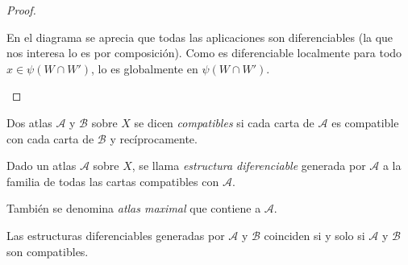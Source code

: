 \documentclass[../VD.tex]{subfiles}
\begin{document}
\begin{proof}
\begin{subproof}
    \begin{figure}[h]
      \centering
    \end{figure}

    En el diagrama se aprecia que todas las aplicaciones son diferenciables (la
    que nos interesa lo es por composición). Como es diferenciable localmente
    para todo \(x \in \psi(W \cap W')\), lo es globalmente en \(\psi(W \cap W')\).
  \end{subproof}
\end{proof}

\begin{definition}
  \label{def:atlas-compat}
  Dos atlas \(\mathcal{A}\) y \(\mathcal{B}\) sobre \(X\) se dicen
  \emph{compatibles} si cada carta de \(\mathcal{A}\) es compatible con cada
  carta de \(\mathcal{B}\) y recíprocamente.
\end{definition}

\begin{definition}
  \label{def:estructura-dif}
  Dado un atlas \(\mathcal{A}\) sobre \(X\), se llama \emph{estructura
    diferenciable} generada por \(\mathcal{A}\) a la familia de todas las cartas
  compatibles con \(\mathcal{A}\).

  También se denomina \emph{atlas maximal} que contiene a \(\mathcal{A}\).
\end{definition}

\begin{lemma}
  Las estructuras diferenciables generadas por \(\mathcal{A}\) y \(\mathcal{B}\)
  coinciden si y solo si \(\mathcal{A}\) y \(\mathcal{B}\) son compatibles.
\end{lemma}
\end{document}
